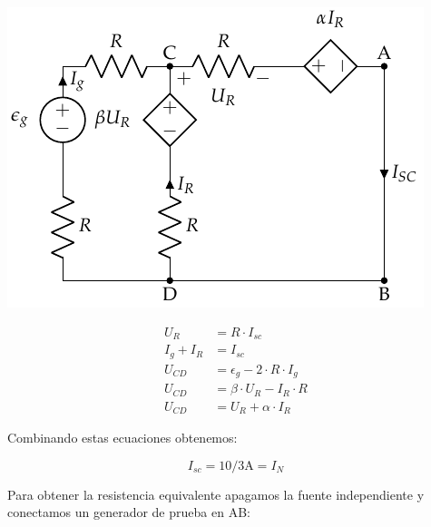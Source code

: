 \begin{minipage}{0.5\linewidth}
  \includegraphics[width=.9\linewidth]{figuras/norton_corto.pdf}
\end{minipage}
\begin{minipage}{0.5\linewidth}
  \begin{align*}
    U_R &= R \cdot I_{sc}\\
    I_g+ I_R &= I_{sc}\\
    U_{CD} &= \epsilon_g - 2 \cdot R \cdot I_g\\
    U_{CD} &= \beta \cdot U_R - I_R \cdot R\\
    U_{CD} &= U_R + \alpha \cdot I_R
  \end{align*}
\end{minipage}

Combinando estas ecuaciones obtenemos:

\begin{equation*}
  I_{sc} = 10/3\si{\ampere} = I_N
\end{equation*}

Para obtener la resistencia equivalente apagamos la fuente independiente y conectamos un generador de prueba en AB:


